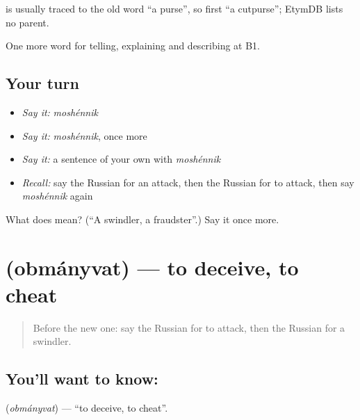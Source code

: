 \begin{cousinweb}
\emph{} is usually traced to the old word \emph{} \textquotedblleft{}a purse\textquotedblright{}, so first \textquotedblleft{}a cutpurse\textquotedblright{}; EtymDB lists no parent.
\end{cousinweb}

\begin{grammarlens}[title={What you've built}]
One more word for telling, explaining and describing at B1.
\end{grammarlens}

\subsection*{Your turn}
\begin{itemize}
\raggedright
  \item \emph{Say it:} \emph{moshénnik}
  \item \emph{Say it:} \emph{moshénnik}, once more
  \item \emph{Say it:} a sentence of your own with \emph{moshénnik}
  \item \emph{Recall:} say the Russian for an attack, then the Russian for to attack, then say \emph{moshénnik} again
\end{itemize}

\begin{tcolorbox}[breakable,colback=teal!4,colframe=teal!35!black,title={Before you move on}]
What does  mean? (\textquotedblleft{}A swindler, a fraudster\textquotedblright{}.) Say it once more.
\end{tcolorbox}
\section[\texorpdfstring{\ru{обманывать} (obmányvat)}{обманывать (obmányvat)}]{ (obmányvat) — to deceive, to cheat}

\label{lesson:RU-C290-obmanyvat}



\begin{quote}
Before the new one: say the Russian for to attack, then the Russian for a swindler.
\end{quote}

\subsection*{You'll want to know: }
\textbf{} (\emph{obmányvat}) — \textquotedblleft{}to deceive, to cheat\textquotedblright{}.

